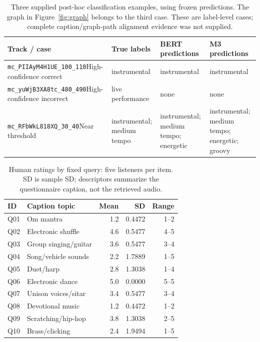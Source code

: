 \documentclass[conference]{IEEEtran}
\begin{document}
\begin{table}[!ht]\centering\small
\caption{Three supplied post-hoc classification examples, using frozen predictions. The graph in Figure~\ref{fig:graph} belongs to the third case. These are label-level cases; complete caption/graph-path alignment evidence was not supplied.}\label{tab:cases}
\begin{tabular}{@{}p{}p{}p{}p{}@{}}\toprule
Track / case & True labels & BERT predictions & M3 predictions\\\midrule
\texttt{mc\_PIIAyM4H1UE\_100\_110}\newline High-confidence correct & instrumental & instrumental & instrumental\\
\texttt{mc\_yuWjB3XA8tc\_480\_490}\newline High-confidence incorrect & live performance & none & none\\
\texttt{mc\_RFbWkL818XQ\_30\_40}\newline Near threshold & instrumental; medium tempo & instrumental; medium tempo; energetic & instrumental; medium tempo; energetic; groovy\\\bottomrule
\end{tabular}
\end{table}

\begin{table}[!ht]\centering\small
\caption{Human ratings by fixed query: five listeners per item. SD is sample SD; descriptors summarize the questionnaire caption, not the retrieved audio.}\label{tab:human}
\begin{tabular}{@{}llrrr@{}}\toprule
ID & Caption topic & Mean & SD & Range\\\midrule
Q01 & Om mantra & 1.2 & 0.4472 & 1--2\\
Q02 & Electronic shuffle & 4.6 & 0.5477 & 4--5\\
Q03 & Group singing/guitar & 3.6 & 0.5477 & 3--4\\
Q04 & Song/vehicle sounds & 2.2 & 1.7889 & 1--5\\
Q05 & Duet/harp & 2.8 & 1.3038 & 1--4\\
Q06 & Electronic dance & 5.0 & 0.0000 & 5--5\\
Q07 & Unison voices/sitar & 3.4 & 0.5477 & 3--4\\
Q08 & Devotional music & 1.2 & 0.4472 & 1--2\\
Q09 & Scratching/hip-hop & 3.8 & 1.3038 & 2--5\\
Q10 & Brass/clicking & 2.4 & 1.9494 & 1--5\\\bottomrule
\end{tabular}
\end{table}
\end{document}
